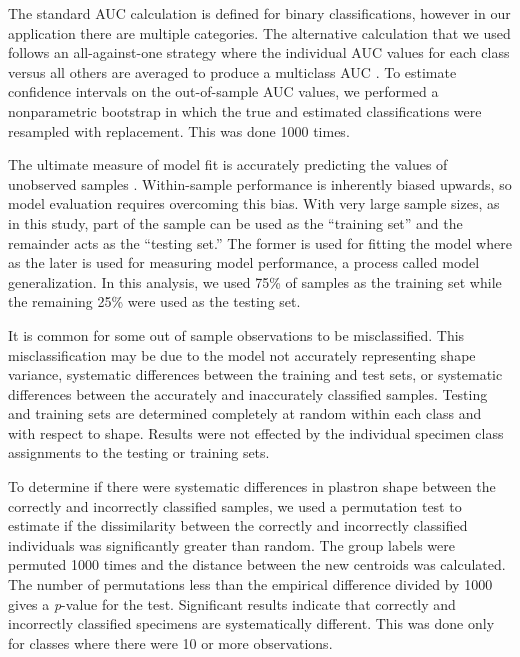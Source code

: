 \documentclass[12pt,letterpaper]{article}
\begin{document}
The standard AUC calculation is defined for binary classifications, however in our application there are multiple categories. The alternative calculation that we used follows an all-against-one strategy where the individual AUC values for each class versus all others are averaged to produce a multiclass AUC \citep{Hand2001}. To estimate confidence intervals on the out-of-sample AUC values, we performed a nonparametric bootstrap in which the true and estimated classifications were resampled with replacement. This was done 1000 times.

The ultimate measure of model fit is accurately predicting the values of unobserved samples \citep{Hastie2009,Kuhn2013}. Within-sample performance is inherently biased upwards, so model evaluation requires overcoming this bias. With very large sample sizes, as in this study, part of the sample can be used as the ``training set'' and the remainder acts as the ``testing set.'' The former is used for fitting the model where as the later is used for measuring model performance, a process called model generalization. In this analysis, we used 75\% of samples as the training set while the remaining 25\% were used as the testing set.

It is common for some out of sample observations to be misclassified. This misclassification may be due to the model not accurately representing shape variance, systematic differences between the training and test sets, or systematic differences between the accurately and inaccurately classified samples. Testing and training sets are determined completely at random within each class and with respect to shape. Results were not effected by the individual specimen class assignments to the testing or training sets.

To determine if there were systematic differences in plastron shape between the correctly and incorrectly classified samples, we used a permutation test to estimate if the dissimilarity between the correctly and incorrectly classified individuals was significantly greater than random. The group labels were permuted 1000 times and the distance between the new centroids was calculated. The number of permutations less than the empirical difference divided by 1000 gives a \textit{p}-value for the test. Significant results indicate that correctly and incorrectly classified specimens are systematically different. This was done only for classes where there were 10 or more observations.
\end{document}
